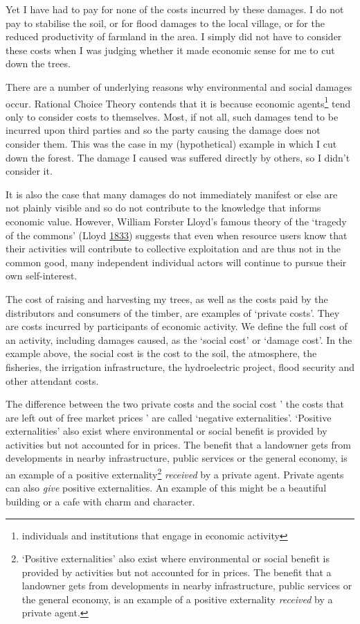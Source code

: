 \documentclass[]{tufte-handout}
\begin{document}
Yet I have had to pay for none of the costs incurred by these damages. I
do not pay to stabilise the soil, or for flood damages to the local
village, or for the reduced productivity of farmland in the area. I
simply did not have to consider these costs when I was judging whether
it made economic sense for me to cut down the trees.

There are a number of underlying reasons why environmental and social
damages occur. Rational Choice Theory contends that it is because
economic agents\footnote{individuals and institutions that engage in
  economic activity} tend only to consider costs to themselves. Most, if
not all, such damages tend to be incurred upon third parties and so the
party causing the damage does not consider them. This was the case in my
(hypothetical) example in which I cut down the forest. The damage I
caused was suffered directly by others, so I didn't consider it.

It is also the case that many damages do not immediately manifest or
else are not plainly visible and so do not contribute to the knowledge
that informs economic value. However, William Forster Lloyd's famous
theory of the `tragedy of the commons' (Lloyd
\protect\hyperlink{ref-Lloyd1833}{1833}) suggests that even when
resource users know that their activities will contribute to collective
exploitation and are thus not in the common good, many independent
individual actors will continue to pursue their own self-interest.

The cost of raising and harvesting my trees, as well as the costs paid
by the distributors and consumers of the timber, are examples of
`private costs'. They are costs incurred by participants of economic
activity. We define the full cost of an activity, including damages
caused, as the `social cost' or `damage cost'. In the example above, the
social cost is the cost to the soil, the atmosphere, the fisheries, the
irrigation infrastructure, the hydroelectric project, flood security and
other attendant costs.

The difference between the two private costs and the social cost ' the
costs that are left out of free market prices ' are called `negative
externalities'. `Positive externalities' also exist where environmental
or social benefit is provided by activities but not accounted for in
prices. The benefit that a landowner gets from developments in nearby
infrastructure, public services or the general economy, is an example of
a positive externality\footnote{`Positive externalities' also exist
  where environmental or social benefit is provided by activities but
  not accounted for in prices. The benefit that a landowner gets from
  developments in nearby infrastructure, public services or the general
  economy, is an example of a positive externality \emph{received} by a
  private agent. } \emph{received} by a private agent. Private agents
can also \emph{give} positive externalities. An example of this might be
a beautiful building or a cafe with charm and character.
\end{document}
